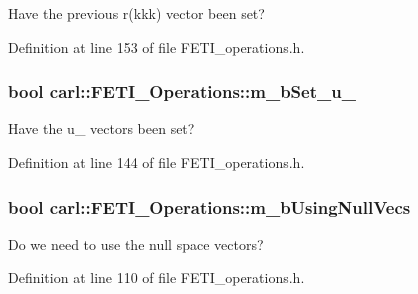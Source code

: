 Have the previous {\ttfamily r(kkk)} vector been set? 



Definition at line 153 of file F\+E\+T\+I\+\_\+operations.\+h.

\hypertarget{classcarl_1_1_f_e_t_i___operations_abf724cc3aa790877475fcea5116802b0}{}
\subsubsection[{m\+\_\+b\+Set\+\_\+u\+\_\+0}]{\setlength{\rightskip}{0pt plus 5cm}bool carl\+::\+F\+E\+T\+I\+\_\+\+Operations\+::m\+\_\+b\+Set\+\_\+u\+\_\hspace{0.3cm}{\ttfamily [protected]}}\label{classcarl_1_1_f_e_t_i___operations_abf724cc3aa790877475fcea5116802b0}


Have the u\+\_ vectors been set? 



Definition at line 144 of file F\+E\+T\+I\+\_\+operations.\+h.

\hypertarget{classcarl_1_1_f_e_t_i___operations_aff68699ccceb6e1debc4ecab97dde2ff}{}
\subsubsection[{m\+\_\+b\+Using\+Null\+Vecs}]{\setlength{\rightskip}{0pt plus 5cm}bool carl\+::\+F\+E\+T\+I\+\_\+\+Operations\+::m\+\_\+b\+Using\+Null\+Vecs\hspace{0.3cm}{\ttfamily [protected]}}\label{classcarl_1_1_f_e_t_i___operations_aff68699ccceb6e1debc4ecab97dde2ff}


Do we need to use the null space vectors? 



Definition at line 110 of file F\+E\+T\+I\+\_\+operations.\+h.

\hypertarget{classcarl_1_1_f_e_t_i___operations_a397d6a5e3e4111e06bb1ec52abdc6fa8}{}
